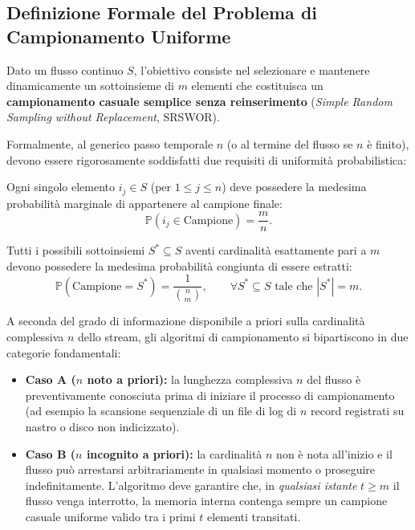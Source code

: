 \subsection{Definizione Formale del Problema di Campionamento Uniforme}
Dato un flusso continuo $S$, l'obiettivo consiste nel selezionare e mantenere dinamicamente un sottoinsieme di $m$ elementi che costituisca un \textbf{campionamento casuale semplice senza reinserimento} (\textit{Simple Random Sampling without Replacement}, SRSWOR).

Formalmente, al generico passo temporale $n$ (o al termine del flusso se $n$ è finito), devono essere rigorosamente soddisfatti due requisiti di uniformità probabilistica:

\begin{definition}
Ogni singolo elemento $i_j \in S$ (per $1 \le j \le n$) deve possedere la medesima probabilità marginale di appartenere al campione finale:
\begin{equation}
  \mathbb{P}(i_j \in \text{Campione}) = \frac{m}{n}.
  \label{eq:marginal-uniformity}
\end{equation}
\end{definition}

\begin{definition}
Tutti i possibili sottoinsiemi $S^* \subseteq S$ aventi cardinalità esattamente pari a $m$ devono possedere la medesima probabilità congiunta di essere estratti:
\begin{equation}
  \mathbb{P}(\text{Campione} = S^*) = \frac{1}{\binom{n}{m}}, \qquad \forall S^* \subseteq S \text{ tale che } |S^*| = m.
  \label{eq:joint-uniformity}
\end{equation}
\end{definition}

A seconda del grado di informazione disponibile a priori sulla cardinalità complessiva $n$ dello stream, gli algoritmi di campionamento si bipartiscono in due categorie fondamentali:
\begin{itemize}
  \item \textbf{Caso A ($n$ noto a priori):} la lunghezza complessiva $n$ del flusso è preventivamente conosciuta prima di iniziare il processo di campionamento (ad esempio la scansione sequenziale di un file di log di $n$ record registrati su nastro o disco non indicizzato).
  \item \textbf{Caso B ($n$ incognito a priori):} la cardinalità $n$ non è nota all'inizio e il flusso può arrestarsi arbitrariamente in qualsiasi momento o proseguire indefinitamente. L'algoritmo deve garantire che, in \emph{qualsiasi istante} $t \ge m$ il flusso venga interrotto, la memoria interna contenga sempre un campione casuale uniforme valido tra i primi $t$ elementi transitati.
\end{itemize}

